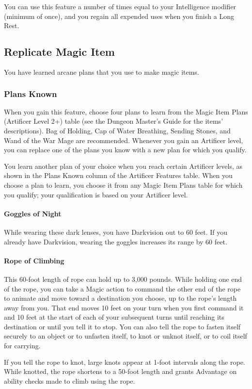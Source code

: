 \documentclass[letterpaper,openany,oneside,twocolumn]{book}
\begin{document}
You can use this feature a number of times equal to your Intelligence modifier (minimum of once), and you regain all expended uses when you finish a Long Rest.
\subsection*{Replicate Magic Item}
You have learned arcane plans that you use to make magic items.
\subsubsection*{Plans Known}
When you gain this feature, choose four plans to learn from the Magic Item Plans (Artificer Level 2+) table (see the Dungeon Master's Guide for the items' descriptions). Bag of Holding, Cap of Water Breathing, Sending Stones, and Wand of the War Mage are recommended. Whenever you gain an Artificer level, you can replace one of the plans you know with a new plan for which you qualify.

You learn another plan of your choice when you reach certain Artificer levels, as shown in the Plans Known column of the Artificer Features table. When you choose a plan to learn, you choose it from any Magic Item Plans table for which you qualify; your qualification is based on your Artificer level.
\paragraph*{Goggles of Night} While wearing these dark lenses, you have Darkvision out to 60 feet. If you already have Darkvision, wearing the goggles increases its range by 60 feet.
\paragraph*{Rope of Climbing} This 60-foot length of rope can hold up to 3,000 pounds. While holding one end of the rope, you can take a Magic action to command the other end of the rope to animate and move toward a destination you choose, up to the rope's length away from you. That end moves 10 feet on your turn when you first command it and 10 feet at the start of each of your subsequent turns until reaching its destination or until you tell it to stop. You can also tell the rope to fasten itself securely to an object or to unfasten itself, to knot or unknot itself, or to coil itself for carrying.

If you tell the rope to knot, large knots appear at 1-foot intervals along the rope. While knotted, the rope shortens to a 50-foot length and grants Advantage on ability checks made to climb using the rope.
\end{document}
